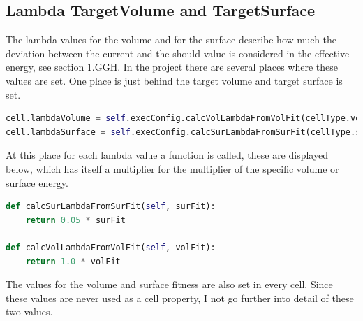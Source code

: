 \subsection{Lambda TargetVolume and TargetSurface}
The lambda values for the volume and for the surface describe how much the deviation between the current and the should value is considered in the effective energy, see section 1.GGH.
In the project there are several places where these values are set. One place is just behind the target volume and target surface is set.
\begin{lstlisting}[language=Python, caption = set lambda volume and lambda surface]
cell.lambdaVolume = self.execConfig.calcVolLambdaFromVolFit(cellType.volFit)
cell.lambdaSurface = self.execConfig.calcSurLambdaFromSurFit(cellType.surFit)
\end{lstlisting}
At this place for each lambda value a function is called, these are displayed below, which has itself a multiplier for the multiplier of the specific volume or surface energy.
\begin{lstlisting}[language=Python, caption = functions to calculate the lambda multiplier for the effective energy of the volume and surface]
def calcSurLambdaFromSurFit(self, surFit):
    return 0.05 * surFit

def calcVolLambdaFromVolFit(self, volFit):
	return 1.0 * volFit
\end{lstlisting}

The values for the volume and surface fitness are also set in every cell. Since these values are never used as a cell property, I not go further into detail of these two values.





